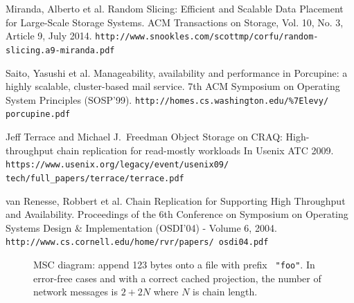 \documentclass[preprint,10pt]{sigplanconf}
\begin{document}
\begin{thebibliography}{}
Miranda, Alberto et al.
Random Slicing: Efficient and Scalable Data Placement for Large-Scale Storage Systems.
ACM Transactions on Storage, Vol. 10, No. 3, Article 9, July 2014.
{\tt http://www.snookles.com/scottmp/corfu/random- slicing.a9-miranda.pdf}

Saito, Yasushi et al.
Manageability, availability and performance in Porcupine: a highly scalable, cluster-based mail service.
7th ACM Symposium on Operating System Principles (SOSP’99).
{\tt http://homes.cs.washington.edu/\%7Elevy/ porcupine.pdf}

Jeff Terrace and Michael J.~Freedman
Object Storage on CRAQ: High-throughput chain replication for read-mostly workloads
In Usenix ATC 2009.
{\tt https://www.usenix.org/legacy/event/usenix09/ tech/full\_papers/terrace/terrace.pdf}

van Renesse, Robbert et al.
Chain Replication for Supporting High Throughput and Availability.
Proceedings of the 6th Conference on Symposium on Operating Systems
Design \& Implementation (OSDI'04) - Volume 6, 2004.
{\tt http://www.cs.cornell.edu/home/rvr/papers/ osdi04.pdf}

\end{thebibliography}



\begin{figure}[tp]
\caption{MSC diagram: append 123 bytes onto a file with prefix {\tt
    "foo"}. In error-free cases and with a correct cached projection, the
  number of network messages is $2 + 2N$ where $N$ is chain length.}
\label{fig:append-flowMSC}
\end{figure}
\end{document}
